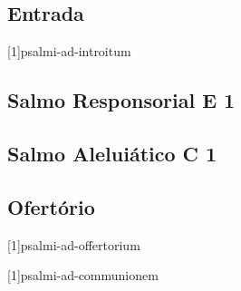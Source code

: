 
\subsection{Entrada}\label{subsection:missae-pro-varii-necessitatibus/in-anniversario-papae-vel-episcopi/introitus}
[1]{psalmi-ad-introitum}

\subsection[Salmo Responsorial]{Salmo Responsorial \textmd{E 1}}\label{subsection:missae-pro-varii-necessitatibus/in-anniversario-papae-vel-episcopi/psalmus-responsorius}

\AllowPageFlush

\subsection[Salmo Aleluiático]{Salmo Aleluiático \textmd{C 1}}\label{subsection:missae-pro-varii-necessitatibus/in-anniversario-papae-vel-episcopi/psalmus-alleluiaticus}

\AllowPageFlush

\subsection{Ofertório}\label{subsection:missae-pro-varii-necessitatibus/in-anniversario-papae-vel-episcopi/offertorium}
[1]{psalmi-ad-offertorium}

\AllowPageFlush

\label{subsection:missae-pro-varii-necessitatibus/in-anniversario-papae-vel-episcopi/communio-1}
[1]{psalmi-ad-communionem}

\AllowPageFlush

\label{subsection:missae-pro-varii-necessitatibus/in-anniversario-papae-vel-episcopi/communio-2}

